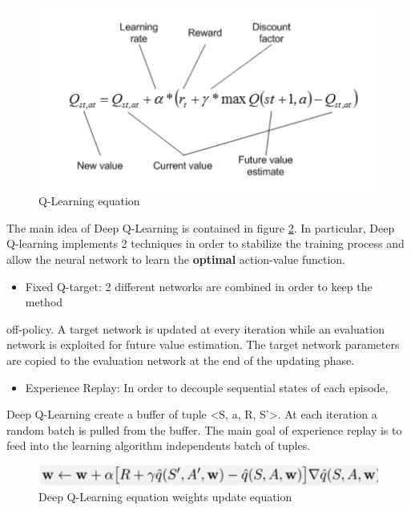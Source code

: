 \documentclass[11pt]{article}
\begin{document}
\begin{figure}[htbp]
\centering
\includegraphics[width=.9\linewidth]{./contents/equation.png}
\caption{\label{fig:org2c6fb64}Q-Learning equation}
\end{figure}

The main idea of Deep Q-Learning is contained in figure \ref{fig:org4b93f5f}. In particular,
Deep Q-learning implements 2 techniques in order to stabilize the training
process and allow the neural network to learn the \textbf{optimal} action-value
function.
\begin{itemize}
\item Fixed Q-target: 2 different networks are combined in order to keep the method
\end{itemize}
off-policy. A target network is updated at every iteration while an evaluation
network is exploited for future value estimation. The target network parameters
are copied to the evaluation network at the end of the updating phase.

\begin{itemize}
\item Experience Replay: In order to decouple sequential states of each episode,
\end{itemize}
Deep Q-Learning create a buffer of tuple <S, a, R, S'>. At each iteration a
random batch is pulled from the buffer. The main goal of experience replay is to
feed into the learning algorithm independents batch of tuples.

\begin{figure}[htbp]
\centering
\includegraphics[width=.9\linewidth]{./contents/dql.png}
\caption{\label{fig:org4b93f5f}Deep Q-Learning equation weights update equation}
\end{figure}
\end{document}
